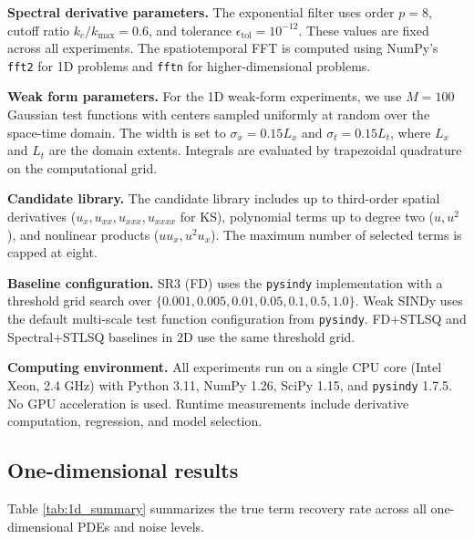 \documentclass[preprint,12pt]{elsarticle}
\begin{document}
\textbf{Spectral derivative parameters.} The exponential filter uses order $p=8$, cutoff ratio $k_c/k_{\max}=0.6$, and tolerance $\epsilon_{\mathrm{tol}}=10^{-12}$. These values are fixed across all experiments. The spatiotemporal FFT is computed using NumPy's \texttt{fft2} for 1D problems and \texttt{fftn} for higher-dimensional problems.

\textbf{Weak form parameters.} For the 1D weak-form experiments, we use $M=100$ Gaussian test functions with centers sampled uniformly at random over the space-time domain. The width is set to $\sigma_x = 0.15 L_x$ and $\sigma_t = 0.15 L_t$, where $L_x$ and $L_t$ are the domain extents. Integrals are evaluated by trapezoidal quadrature on the computational grid.

\textbf{Candidate library.} The candidate library includes up to third-order spatial derivatives ($u_x, u_{xx}, u_{xxx}, u_{xxxx}$ for KS), polynomial terms up to degree two ($u, u^2$), and nonlinear products ($u u_x, u^2 u_x$). The maximum number of selected terms is capped at eight.

\textbf{Baseline configuration.} SR3 (FD) uses the \texttt{pysindy} implementation with a threshold grid search over $\{0.001, 0.005, 0.01, 0.05, 0.1, 0.5, 1.0\}$. Weak SINDy uses the default multi-scale test function configuration from \texttt{pysindy}. FD+STLSQ and Spectral+STLSQ baselines in 2D use the same threshold grid.

\textbf{Computing environment.} All experiments run on a single CPU core (Intel Xeon, 2.4 GHz) with Python 3.11, NumPy 1.26, SciPy 1.15, and \texttt{pysindy} 1.7.5. No GPU acceleration is used. Runtime measurements include derivative computation, regression, and model selection.

\subsection{One-dimensional results}
\label{sec:1d}

Table \ref{tab:1d_summary} summarizes the true term recovery rate across all one-dimensional PDEs and noise levels.
\end{document}
